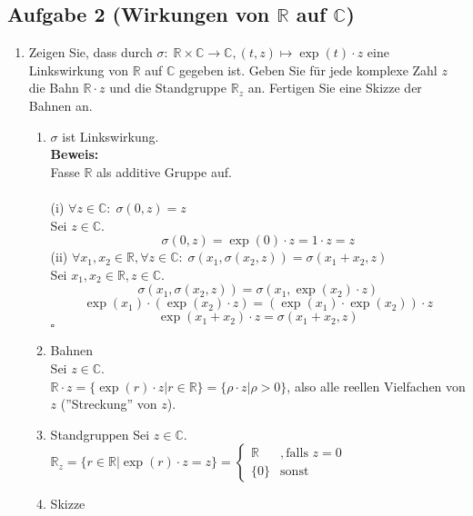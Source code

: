 \documentclass[11pt,a4paper,ngerman]{article}
\newcommand{\C}{\mathbb{C}}
\newcommand{\R}{\mathbb{R}}
\begin{document}

\subsection*{Aufgabe 2 \mdseries (Wirkungen von $\R$ auf $\C$)}

\begin{enumerate}[\bfseries a)]
\item Zeigen Sie, dass durch $\sigma:\;\R \times \C \to \C, (t, z) \mapsto \exp(t) \cdot z$
eine Linkswirkung von $\R$ auf $\C$ gegeben ist. Geben Sie für jede komplexe Zahl $z$ die
Bahn $\R \cdot z$ und die Standgruppe $\R_z$ an. Fertigen Sie eine Skizze der Bahnen an.
\begin{enumerate}[\bfseries (1)]
\item $\sigma$ ist Linkswirkung. \\
\textbf{Beweis:}\\
Fasse $\R$ als additive Gruppe auf. \\ \\
(i) $\forall z \in \C:\; \sigma(0,z) = z$ \\
Sei $z \in \C$.
$$ \sigma(0,z) = \exp(0) \cdot z = 1 \cdot z = z $$
\newpage
(ii) $\forall x_1, x_2 \in \R, \forall z \in \C: \; \sigma(x_1, \sigma(x_2,z)) = \sigma (x_1 + x_2, z)$ \\
Sei $ x_1, x_2 \in \R, z \in \C$.
$$ \sigma(x_1, \sigma(x_2,z)) = \sigma(x_1, \exp(x_2) \cdot z) $$
$$ \exp(x_1) \cdot (\exp(x_2) \cdot z) = (\exp(x_1) \cdot \exp(x_2)) \cdot z $$
$$ \exp(x_1 + x_2) \cdot z = \sigma(x_1 + x_2, z)$$
\mbox{} \hfill $\square$\\

\item Bahnen \\
Sei $z \in \C$. \\
$ \R \cdot z = \{ \exp(r) \cdot z | r \in \R \} = \{\rho \cdot z | \rho > 0 \}$, also alle reellen Vielfachen von $z$ (''Streckung'' von $z$).
\item Standgruppen
Sei $z \in \C$. \\
$\R_z = \{r \in \R | \exp(r) \cdot z = z \} = \left\{
\begin{array}{cc}
\R &, \text{falls } z = 0 \\
\{0\} & \text{sonst}
\end{array}
 \right.$
\item Skizze
\vspace{7cm}


\end{enumerate}
\end{enumerate}
\end{document}
